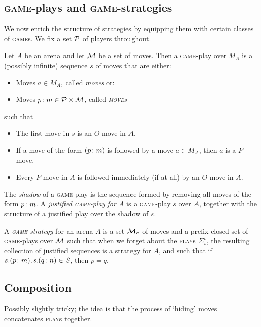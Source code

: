 \documentclass{article}
\newcommand{\game}{\textsc{game}}
\newcommand{\play}{\textsc{play}}
\newcommand{\move}{\textsc{move}}
\begin{document}
\subsection{\game{}-plays and \game{}-strategies}

We now enrich the structure of strategies by equipping them with certain classes of \game{}s. We fix a set $\P$ of players throughout.

\begin{definition}
  Let $A$ be an arena and let $\M$ be a set of moves.  
  Then a \game{}-play over $M_A$ is a (possibly infinite) sequence $s$ of moves that are either:
  \begin{itemize}
    \item Moves $a\in M_A$, called \emph{moves} or:
    \item Moves $p\from m\in \P\times\M$, called \emph{\move{}s}
  \end{itemize}
  such that
  \begin{itemize}
    \item The first move in $s$ is an $O$-move in $A$.
    \item If a move of the form $(p\from m)$ is followed by a move $a\in M_A$, then $a$ is a $P$-move.
    \item Every $P$-move in $A$ is followed immediately (if at all) by an $O$-move in $A$.
  \end{itemize}

  The \emph{shadow} of a \game{}-play is the sequence formed by removing all moves of the form $p\from m$.  
  A \emph{justified \game{}-play for $A$} is a \game{}-play $s$ over $A$, together with the structure of a justified play over the shadow of $s$.
\end{definition}

\begin{definition}
  A \emph{\game{}-strategy} for an arena $A$ is a set $\M_\sigma$ of moves and a prefix-closed set of \game{}-plays over $\M$ such that when we forget about the \play{}s $\Sigma_s^t$, the resulting collection of justified sequences is a strategy for $A$, and such that if $s.(p\from m),s.(q\from n)\in S$, then $p=q$.
\end{definition}

\subsection{Composition}

Possibly slightly tricky; the idea is that the process of `hiding' moves concatenates \play{}s together.
\end{document}
